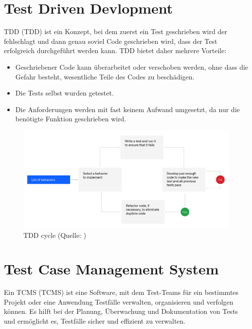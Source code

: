 \documentclass[a4paper, fontsize=11pt, parskip=half, twoside]{scrreprt}
\begin{document}
	
	\section{Test Driven Devlopment}
	\acl{TDD} (\ac{TDD}) ist ein Konzept, bei dem zuerst ein Test geschrieben wird der fehlschlagt und dann genau soviel Code geschrieben wird, dass der Test erfolgreich durchgeführt werden kann.
	\ac{TDD} bietet daher mehrere Vorteile:
	
	\begin{itemize}
		\item Geschriebener Code kann überarbeitet oder verschoben werden, ohne dass die Gefahr besteht, wesentliche Teile des Codes zu beschädigen.
		\item Die Tests selbst wurden getestet.
		\item Die Anforderungen werden mit fast keinem Aufwand umgesetzt, da nur die benötigte Funktion geschrieben wird.
	\end{itemize}

	\textcite{ammann_introduction_2016}
	
	\begin{figure}[H]
		\centering
		\includegraphics[scale=0.25]{assets/tdd-cycle.png}
		\caption{\ac{TDD} cycle (Quelle: \textcite{noauthor_test-driven_nodate})}
		\label{fig:tdd-cycle}
	\end{figure}
	
	\section{Test Case Management System} \label{sec:tcms}
	Ein \acl{TCMS} (\ac{TCMS}) ist eine Software, mit dem Test-Teams für ein bestimmtes Projekt oder eine Anwendung Testfälle verwalten, organisieren und verfolgen können.
	Es hilft bei der Planung, Überwachung und Dokumentation von Tests und ermöglicht es, Testfälle sicher und effizient zu verwalten.
	
\end{document}
